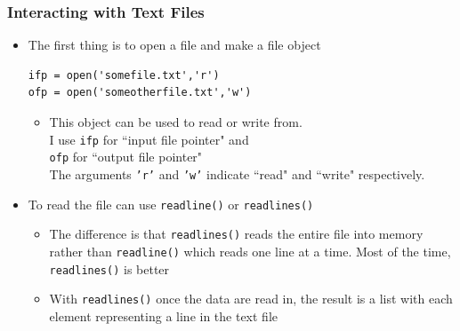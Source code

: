 \documentclass{beamer}
\begin{document}
\begin{frame}[fragile]
\frametitle{Interacting with Text Files}
\begin{itemize}
\item The first thing is to open a file and make a file object
\begin{lstlisting}
ifp = open('somefile.txt','r')
ofp = open('someotherfile.txt','w')
\end{lstlisting}
\begin{itemize}
\item This object can be used to read or write from. \\I use \texttt{ifp} for ``input file pointer" and\\ \texttt{ofp} for ``output file pointer" \\
The arguments \texttt{'r'} and \texttt{'w'} indicate ``read" and ``write" respectively.
\end{itemize}
\item To read the file can use \texttt{readline()} or \texttt{readlines()}\\
\begin{itemize}
\item The difference is that  \texttt{readlines()} reads the entire file into memory rather than  \texttt{readline()}  which reads one line at a time. Most of the time,  \texttt{readlines()}  is better
\item With \texttt{readlines()}  once the data are read in, the result is a list with each element representing a line in the text file
\end{itemize}
\end{itemize}
\end{frame}
\end{document}
